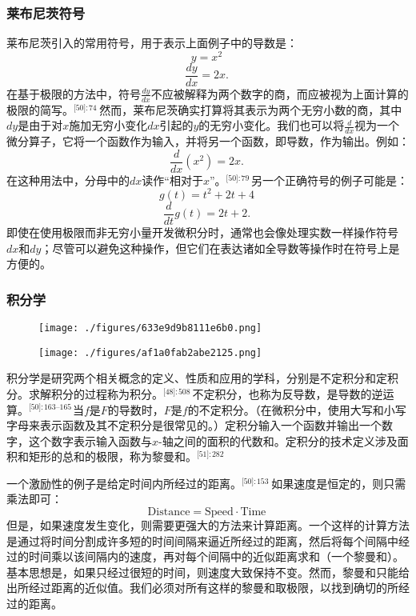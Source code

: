 \subsubsection{莱布尼茨符号} 
莱布尼茨引入的常用符号，用于表示上面例子中的导数是：
\[
y = x^2 ~
\]
\[\frac{dy}{dx} = 2x.~
\]
在基于极限的方法中，符号\(\frac{dy}{dx}\)不应被解释为两个数字的商，而应被视为上面计算的极限的简写。\(^\text{[50]: 74 }\)  然而，莱布尼茨确实打算将其表示为两个无穷小数的商，其中\(dy\)是由于对\(x\)施加无穷小变化\(dx\)引起的\(y\)的无穷小变化。我们也可以将\(\frac{d}{dx}\)视为一个微分算子，它将一个函数作为输入，并将另一个函数，即导数，作为输出。例如：
\[
\frac{d}{dx}(x^2) = 2x.~
\]
在这种用法中，分母中的\(dx\)读作“相对于\(x\)”。\(^\text{[50]: 79 }\) 另一个正确符号的例子可能是：
\[
g(t) = t^2 + 2t + 4~
\]
\[
\frac{d}{dt} g(t) = 2t + 2.~
\]
即使在使用极限而非无穷小量开发微积分时，通常也会像处理实数一样操作符号\(dx\)和\(dy\)；尽管可以避免这种操作，但它们在表达诸如全导数等操作时在符号上是方便的。
\subsubsection{积分学}
\begin{figure}[ht]
\centering
\texttt{[image: ./figures/633e9d9b8111e6b0.png]}
\caption{} \label{fig_Calcul_9}
\end{figure}
\begin{figure}[ht]
\centering
\texttt{[image: ./figures/af1a0fab2abe2125.png]}
\caption{} \label{fig_Calcul_10}
\end{figure}
积分学是研究两个相关概念的定义、性质和应用的学科，分别是不定积分和定积分。求解积分的过程称为积分。\(^\text{[48]: 508  }\)不定积分，也称为反导数，是导数的逆运算。\(^\text{[50]: 163–165}\) 当\(f\)是\(F\)的导数时，\(F\)是\(f\)的不定积分。（在微积分中，使用大写和小写字母来表示函数及其不定积分是很常见的。）定积分输入一个函数并输出一个数字，这个数字表示输入函数与\(x\)-轴之间的面积的代数和。定积分的技术定义涉及面积和矩形的总和的极限，称为黎曼和。\(^\text{[51]: 282  }\)

一个激励性的例子是给定时间内所经过的距离。\(^\text{[50]: 153  }\) 如果速度是恒定的，则只需乘法即可：
\[
\text{Distance} = \text{Speed} \cdot \text{Time}~
\]
但是，如果速度发生变化，则需要更强大的方法来计算距离。一个这样的计算方法是通过将时间分割成许多短的时间间隔来逼近所经过的距离，然后将每个间隔中经过的时间乘以该间隔内的速度，再对每个间隔中的近似距离求和（一个黎曼和）。基本思想是，如果只经过很短的时间，则速度大致保持不变。然而，黎曼和只能给出所经过距离的近似值。我们必须对所有这样的黎曼和取极限，以找到确切的所经过的距离。


